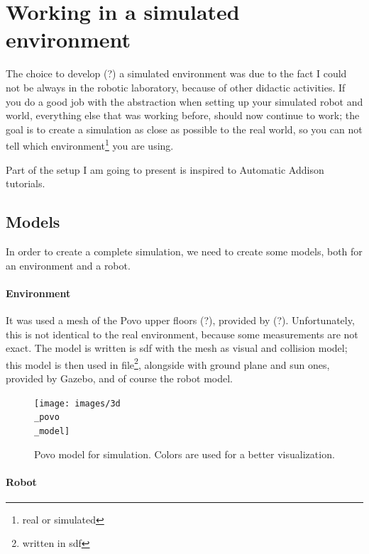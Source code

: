 \chapter{Working in a simulated environment}

The choice to develop (?) a simulated environment was due to the fact I could not be always in the robotic laboratory, because of other didactic activities. If you do a good job with the abstraction when setting up your simulated robot and world, everything else that was working before, should now continue to work; the goal is to create a simulation as close as possible to the real world, so you can not tell which environment\footnote{real or simulated} you are using.

Part of the setup I am going to present is inspired to Automatic Addison tutorials\cite{tutorials}.

\section{Models}

In order to create a complete simulation, we need to create some models, both for an environment and a robot.

\subsubsection{Environment}

It was used a mesh of the Povo upper floors (?), provided by (?). Unfortunately, this is not identical to the real environment, because some measurements are not exact.
The model is written is \Acrfull{sdf} with the mesh as visual and collision model; this model is then used in  file\footnote{written in \Acrshort{sdf}}, alongside with ground plane and sun ones, provided by Gazebo, and of course the robot model.

\begin{figure}[h]
    \centering
    \texttt{[image: images/3d\\\_povo\\\_model]}
    \caption{Povo model for simulation. Colors are used for a better visualization.}
\end{figure}

\newpage

\subsubsection{Robot}


